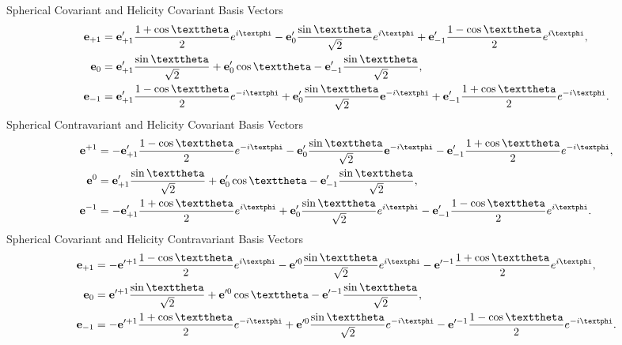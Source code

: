 Spherical Covariant and Helicity Covariant Basis Vectors
\begin{align}
\vect{e}_{+1} & =\vect{e}_{+1}^{\prime} \frac{1+\cos \vartheta}{2} e^{i \varphi}-\vect{e}_{0}^{\prime} \frac{\sin \vartheta}{\sqrt{2}} e^{i \varphi}+\vect{e}_{-1}^{\prime} \frac{1-\cos \vartheta}{2} e^{i \varphi},  \notag\\
\vect{e}_{0} & =\vect{e}_{+1}^{\prime} \frac{\sin \vartheta}{\sqrt{2}}+\vect{e}_{0}^{\prime} \cos \vartheta-\vect{e}_{-1}^{\prime} \frac{\sin \vartheta}{\sqrt{2}},  \label{eq:1:1:41}\\
\vect{e}_{-1} & =\vect{e}_{+1}^{\prime} \frac{1-\cos \vartheta}{2} e^{-i \varphi}+\vect{e}_{0}^{\prime} \frac{\sin \vartheta}{\sqrt{2}} \vect{e}^{-i \varphi}+\vect{e}_{-1}^{\prime} \frac{1+\cos \vartheta}{2} e^{-i \varphi} . \notag
\end{align}
Spherical Contravariant and Helicity Covariant Basis Vectors
\begin{align}
\vect{e}^{+1} & =-\vect{e}_{+1}^{\prime} \frac{1-\cos \vartheta}{2} e^{-i \varphi}-\vect{e}_{0}^{\prime} \frac{\sin \vartheta}{\sqrt{2}} \vect{e}^{-i \varphi}-\vect{e}_{-1}^{\prime} \frac{1+\cos \vartheta}{2} e^{-i \varphi} , \notag\\
\vect{e}^{0} & =\vect{e}_{+1}^{\prime} \frac{\sin \vartheta}{\sqrt{2}}+\vect{e}_{0}^{\prime} \cos \vartheta-\vect{e}_{-1}^{\prime} \frac{\sin \vartheta}{\sqrt{2}}  ,\label{eq:1:1:42}\\
\vect{e}^{-1} & =-\vect{e}_{+1}^{\prime} \frac{1+\cos \vartheta}{2} e^{i \varphi}+\vect{e}_{0}^{\prime} \frac{\sin \vartheta}{\sqrt{2}} e^{i \varphi}-\vect{e}_{-1}^{\prime} \frac{1-\cos \vartheta}{2} e^{i \varphi} \notag.
\end{align}
Spherical Covariant and Helicity Contravariant Basis Vectors
\begin{align}
\vect{e}_{+1} & =-\vect{e}^{\prime+1} \frac{1-\cos \vartheta}{2} e^{i \varphi}-\vect{e}^{\prime 0} \frac{\sin \vartheta}{\sqrt{2}} e^{i \varphi}-\vect{e}^{\prime-1} \frac{1+\cos \vartheta}{2} e^{i \varphi},  \notag\\
\vect{e}_{0} & =\vect{e}^{\prime+1} \frac{\sin \vartheta}{\sqrt{2}}+\vect{e}^{\prime 0} \cos \vartheta-\vect{e}^{\prime-1} \frac{\sin \vartheta}{\sqrt{2}},  \label{eq:1:1:43}\\
\vect{e}_{-1} & =-\vect{e}^{\prime+1} \frac{1+\cos \vartheta}{2} e^{-i \varphi}+\vect{e}^{\prime 0} \frac{\sin \vartheta}{\sqrt{2}} e^{-i \varphi}-\vect{e}^{\prime-1} \frac{1-\cos \vartheta}{2} e^{-i \varphi} . \notag
\end{align}
